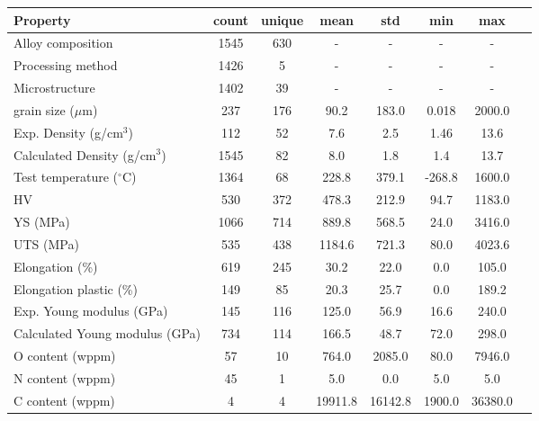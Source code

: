 \begin{tabular}{lccccccc}
\toprule
Property & count & unique & mean & std & min & max \\
\midrule
Alloy composition & 1545 & 630 & - & - & - & - \\
Processing method & 1426 & 5 & - & - & - & - \\
Microstructure & 1402 & 39 & - & - & - & - \\
grain size ($\mu$m) & 237 & 176 & 90.2 & 183.0 & 0.018 & 2000.0 \\
Exp. Density (g/cm$^3$) & 112 & 52 & 7.6 & 2.5 & 1.46 & 13.6 \\
Calculated Density (g/cm$^3$) & 1545 & 82 & 8.0 & 1.8 & 1.4 & 13.7 \\
Test temperature ($^\circ$C) & 1364 & 68 & 228.8 & 379.1 & -268.8 & 1600.0 \\
HV & 530 & 372 & 478.3 & 212.9 & 94.7 & 1183.0 \\
YS (MPa) & 1066 & 714 & 889.8 & 568.5 & 24.0 & 3416.0 \\
UTS (MPa) & 535 & 438 & 1184.6 & 721.3 & 80.0 & 4023.6 \\
Elongation (\%) & 619 & 245 & 30.2 & 22.0 & 0.0 & 105.0 \\
Elongation plastic (\%) & 149 & 85 & 20.3 & 25.7 & 0.0 & 189.2 \\
Exp. Young modulus (GPa) & 145 & 116 & 125.0 & 56.9 & 16.6 & 240.0 \\
Calculated Young modulus (GPa) & 734 & 114 & 166.5 & 48.7 & 72.0 & 298.0 \\
O content (wppm) & 57 & 10 & 764.0 & 2085.0 & 80.0 & 7946.0 \\
N content (wppm) & 45 & 1 & 5.0 & 0.0 & 5.0 & 5.0 \\
C content (wppm) & 4 & 4 & 19911.8 & 16142.8 & 1900.0 & 36380.0 \\
\bottomrule
\end{tabular}
